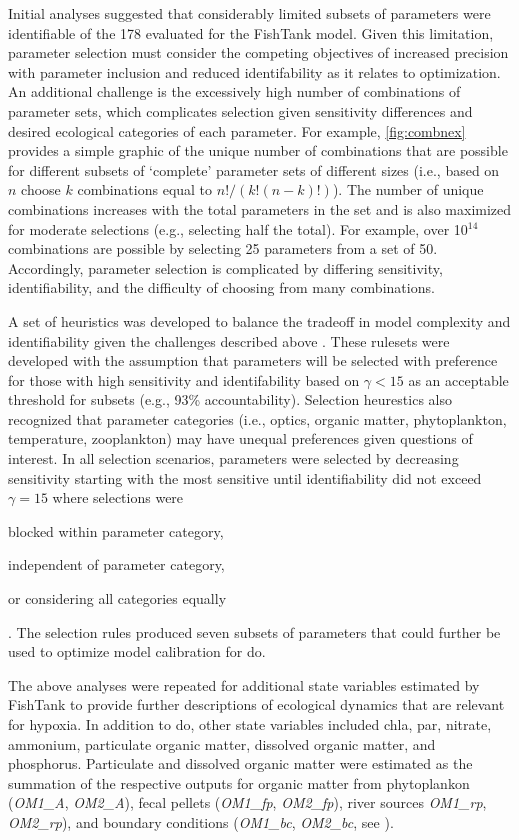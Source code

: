 \documentclass[letterpaper,12pt,oneside]{article}\usepackage[]{graphicx}\usepackage[]{color}
\begin{document}
Initial analyses suggested that considerably limited subsets of parameters were identifiable of the 178 evaluated for the FishTank model.  Given this limitation, parameter selection must consider the competing objectives of increased precision with parameter inclusion and reduced identifability as it relates to optimization.  An additional challenge is the excessively high number of combinations of parameter sets, which complicates selection given sensitivity differences and desired ecological categories of each parameter.  For example, \cref{fig:combnex} provides a simple graphic of the unique number of combinations that are possible for different subsets of `complete' parameter sets of different sizes (i.e., based on $n$ choose $k$ combinations equal to $n!/\left(k!\left(n-k\right)!\right)$).  The number of unique combinations increases with the total parameters in the set and is also maximized for moderate selections (e.g., selecting half the total).  For example, over 10$^{14}$ combinations are possible by selecting 25 parameters from a set of 50.  Accordingly, parameter selection is complicated by differing sensitivity, identifiability, and the difficulty of choosing from many combinations.

A set of heuristics was developed to balance the tradeoff in model complexity and identifiability given the challenges described above \citep[see also][]{Wagener01}.  These rulesets were developed with the assumption that parameters will be selected with preference for those with high sensitivity and identifability based on $\gamma < 15$ as an acceptable threshold for subsets (e.g., 93\% accountability).  Selection heurestics also recognized that parameter categories (i.e., optics, organic matter, phytoplankton, temperature, zooplankton) may have unequal preferences given questions of interest.  In all selection scenarios, parameters were selected by decreasing sensitivity starting with the most sensitive until identifiability did not exceed $\gamma = 15$ where selections were \begin{inparaenum}[1\upshape)]
\item blocked within parameter category,
\item independent of parameter category,
\item or considering all categories equally
\end{inparaenum}.  The selection rules produced seven subsets of parameters that could further be used to optimize model calibration for \ac{do}.

The above analyses were repeated for additional state variables estimated by FishTank to provide further descriptions of ecological dynamics that are relevant for hypoxia.  In addition to \ac{do}, other state variables included \ac{chla}, \ac{par}, nitrate, ammonium, particulate organic matter, dissolved organic matter, and phosphorus.  Particulate and dissolved organic matter were estimated as the summation of the respective outputs for organic matter from phytoplankon (\textit{OM1\_A}, \textit{OM2\_A}), fecal pellets (\textit{OM1\_fp}, \textit{OM2\_fp}), river sources \textit{OM1\_rp}, \textit{OM2\_rp}), and boundary conditions (\textit{OM1\_bc}, \textit{OM2\_bc}, see ). 
\end{document}
